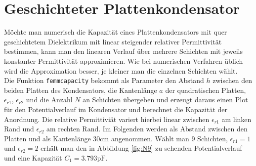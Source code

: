 \section{Geschichteter Plattenkondensator}

Möchte man numerisch die Kapazität eines Plattenkondensators mit quer geschichtetem Dielektrikum mit linear steigender relativer Permittivität bestimmen, kann man den linearen Verlauf über mehrere Schichten mit jeweils konstanter Permittivität approximieren. Wie bei numerischen Verfahren üblich wird die Approximation besser, je kleiner man die einzelnen Schichten wählt.\\
Die Funktion \texttt{femmcapacity} bekommt als Parameter den Abstand $h$ zwischen den beiden Platten des Kondensators, die Kantenlänge $a$ der quadratischen Platten, $\epsilon_{r1}$, $\epsilon_{r2}$ und die Anzahl $N$ an Schichten übergeben und erzeugt daraus einen Plot für den Potentialverlauf im Kondensator und berechnet die Kapazität der Anordnung. Die relative Permittiviät variert hierbei linear zwischen $\epsilon_{r1} $ am linken Rand und $\epsilon_{r2}$ am rechten Rand. Im Folgenden werden als Abstand zwischen den Platten und als Kantenlänge 30cm angenommen. Wählt man 9 Schichten, $\epsilon_{r1} = 1$ und $\epsilon_{r2} = 2$  erhält man den in Abbildung \ref{fig:N9} zu sehenden Potentialverlauf und eine Kapazität $ C_1 = \num{3,793}\si{\pico\farad}$.

